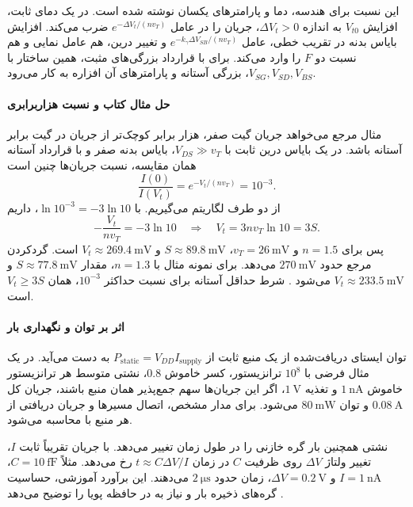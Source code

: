 این نسبت برای هندسه، دما و پارامترهای یکسان نوشته شده است.
در یک دمای ثابت، افزایش \(V_{t0}\) به اندازه \(\Delta V_t>0\)،
جریان را در عامل \(e^{-\Delta V_t/(nv_T)}\) ضرب می‌کند.
افزایش بایاس بدنه در تقریب خطی، عامل
\(e^{-k_\gamma\Delta V_{SB}/(nv_T)}\) و تغییر درین، هم عامل نمایی
 و هم نسبت دو \(F\) را وارد می‌کند.
برای  با قرارداد بزرگی‌های مثبت، همین ساختار با
\(V_{SG},V_{SD},V_{BS}\)، بزرگی آستانه و پارامترهای آن افزاره به کار
می‌رود.

\paragraph*{حل مثال  کتاب و نسبت هزاربرابری}
مثال مرجع می‌خواهد جریان گیت صفر، هزار برابر کوچک‌تر از جریان در
گیت برابر آستانه باشد. در یک بایاس درین ثابت با \(V_{DS}\gg v_T\)،
بایاس بدنه صفر و با قرارداد آستانه همان مقایسه، نسبت جریان‌ها چنین است
\begin{equation*}
 \frac{I(0)}{I(V_t)}=e^{-V_t/(nv_T)}=10^{-3}.
\end{equation*}
از دو طرف لگاریتم می‌گیریم. با \(\ln10^{-3}=-3\ln10\)، داریم
\begin{equation}
 -\frac{V_t}{nv_T}=-3\ln10
 \quad\Longrightarrow\quad V_t=3nv_T\ln10=3S.
 \label{eq:leakage-minimum-threshold}
\end{equation}
پس برای \(n=1.5\) و \(v_T=\qty{26}{\milli\volt}\)،
\(S\approx\qty{89.8}{\milli\volt}\) و
\(V_t\approx\qty{269.4}{\milli\volt}\) است. گردکردن مرجع حدود
\(\qty{270}{\milli\volt}\) می‌دهد. برای نمونه  مثال با \(n=1.3\)، مقدار \(S\approx\qty{77.8}{\milli\volt}\)
و \(V_t\approx\qty{233.5}{\milli\volt}\) می‌شود
\cite[مثال ، صفحه ۸۲]{weste}.
شرط حداقل آستانه برای نسبت حداکثر \(10^{-3}\)، همان
\(V_t\ge3S\) است.

\paragraph*{اثر بر توان و نگهداری بار}
توان ایستای دریافت‌شده از یک منبع ثابت از
\(P_{\mathrm{static}}=V_{DD}I_{\mathrm{supply}}\) به دست می‌آید.
در یک مثال فرضی با \(10^8\) ترانزیستور، کسر خاموش \(0.8\)، نشتی
متوسط هر ترانزیستور خاموش \(\qty{1}{\nano\ampere}\) و تغذیه
\(\qty{1}{\volt}\)، اگر این جریان‌ها سهم جمع‌پذیر همان منبع باشند،
جریان کل \(\qty{0.08}{\ampere}\) و توان \(\qty{80}{\milli\watt}\)
می‌شود. برای مدار مشخص، اتصال مسیرها و جریان دریافتی از هر منبع با
 محاسبه می‌شود.

نشتی همچنین بار گره خازنی را در طول زمان تغییر می‌دهد. با جریان
تقریباً ثابت \(I\)، تغییر ولتاژ \(\Delta V\) روی ظرفیت \(C\) در زمان
\(t\approx C\Delta V/I\) رخ می‌دهد. مثلاً
\(C=\qty{10}{\femto\farad}\)، \(I=\qty{1}{\nano\ampere}\) و
\(\Delta V=\qty{0.2}{\volt}\)، زمان حدود \(\qty{2}{\micro\second}\)
می‌دهند. این برآورد آموزشی، حساسیت گره‌های ذخیره بار و نیاز به
 در حافظه پویا را توضیح می‌دهد
\cite[صفحه ۸۲]{weste}.

